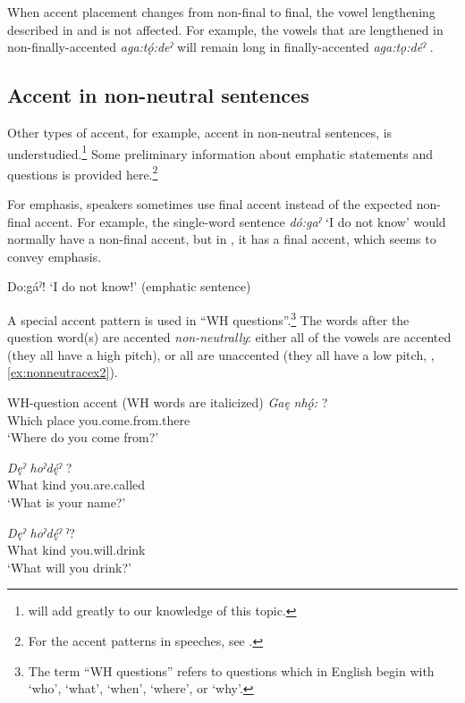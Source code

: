 When accent placement changes from non-final to final, the vowel lengthening described in  and  is not affected. For example, the vowels that are lengthened in non-finally-accented \textit{aga:tǫ́:deˀ}  will remain long in finally-accented \textit{aga:tǫ:déˀ} .


\subsection{Accent in non-neutral sentences} \label{Accent in ‘non-neutral’ sentences}
Other types of accent, for example, accent in non-neutral sentences, is understudied.\footnote{\citet{hatcher_intonation_2022} will add greatly to our knowledge of this topic.} Some preliminary information about emphatic statements and questions is provided here.\footnote{For the accent patterns in speeches, see \citet{foster_earth_1974}.}

For emphasis, speakers sometimes use final accent instead of the expected non-final accent. For example, the single-word sentence \textit{dó:gaˀ} ‘I do not know’ would normally have a non-final accent, but in , it has a final accent, which seems to convey emphasis.

\ea\label{ex:nonneutracex} Do:gáˀ! ‘I do not know!’ (emphatic sentence)
\z

A special accent pattern is used in “WH questions”.\footnote{The term “WH questions” refers to questions which in English begin with ‘who’, ‘what’, ‘when’, ‘where’, or ‘why’.} The words after the question word(s) are accented \emph{non-neutrally}: either all of the vowels are accented (they all have a high pitch), or all are unaccented (they all have a low pitch, \cite{mithun_watewayestanih_1984}, \ref{ex:nonneutracex2}). 

\ea\label{ex:nonneutracex2} WH-question accent (WH words are italicized)
\ea 
 \gll \textit{Gaę} \textit{nhǫ́:} ? \\
 Which place you.come.from.there \\
\glt ‘Where do you come from?’ 

\ex 
 \gll \textit{Dęˀ} \textit{hoˀdę́ˀ} ?  \\
 What kind you.are.called \\
\glt  ‘What is your name?’


\ex 
 \gll \textit{Dęˀ} \textit{hoˀdę́ˀ} ˀ?  \\
 What kind you.will.drink\\
\glt ‘What will you drink?’ 

